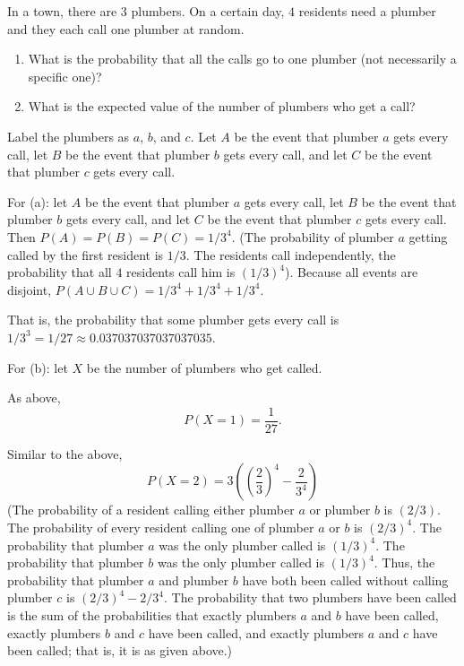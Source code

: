 \newpage
\begin{problem}[Handout 3, \# 5]
  In a town, there are \(3\) plumbers. On a certain day, \(4\) residents
  need a plumber and they each call one plumber at random.
  \begin{enumerate}[label=(\alph*),noitemsep]
  \item What is the probability that all the calls go to one plumber (not
    necessarily a specific one)?
  \item What is the expected value of the number of plumbers who get a
    call?
  \end{enumerate}
\end{problem}
\begin{solution}
  Label the plumbers as $a$, $b$, and $c$. Let $A$ be the event that
  plumber $a$ gets every call, let $B$ be the event that plumber $b$ gets
  every call, and let $C$ be the event that plumber $c$ gets every call.

  For (a): let $A$ be the event that plumber $a$ gets every call, let $B$
  be the event that plumber $b$ gets every call, and let $C$ be the event
  that plumber $c$ gets every call.  Then $P(A)=P(B)=P(C)=1/3^4$. (The
  probability of plumber $a$ getting called by the first resident is
  $1/3$. The residents call independently, the probability that all $4$
  residents call him is $(1/3)^4$). Because all events are disjoint,
  $P(A\cup B\cup C)=1/3^4+1/3^4+1/3^4$.

  That is, the probability that some plumber gets every call is
  $1/3^3=1/27\approx \num{0.037037037037037035}$.

  For (b): let $X$ be the number of plumbers who get called.

  As above,
  \[
    P(X = 1)=\frac{1}{27}.
  \]

  Similar to the above,
  \[
    P(X = 2) = 3\left(\left(\frac{2}{3}\right)^4 - \frac{2}{3^4}
    \right)
  \]
  (The probability of a resident calling either plumber $a$ or plumber $b$
  is $(2/3)$. The probability of every resident calling one of plumber $a$
  or $b$ is $(2/3)^4$. The probability that plumber $a$ was the only
  plumber called is $(1/3)^4$. The probability that plumber $b$ was the
  only plumber called is $(1/3)^4$. Thus, the probability that plumber $a$
  and plumber $b$ have both been called without calling plumber $c$ is
  $(2/3)^4-2/3^4$. The probability that two plumbers have been called is
  the sum of the probabilities that exactly plumbers $a$ and $b$ have been
  called, exactly plumbers $b$ and $c$ have been called, and exactly
  plumbers $a$ and $c$ have been called; that is, it is as given above.)


\end{solution}

